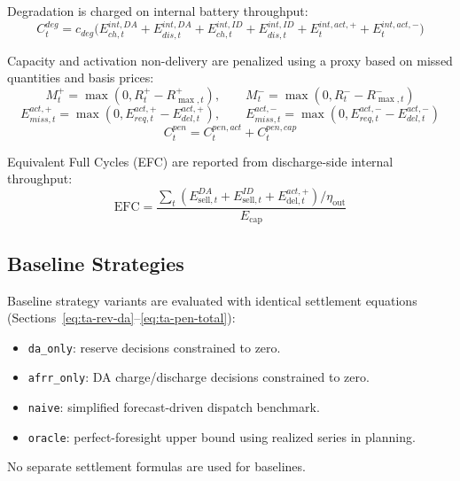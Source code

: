 Degradation is charged on internal battery throughput:
\begin{equation}\label{eq:ta-cost-deg}
    C^{deg}_t
    =
    c_{deg}\Big(
    E^{int,DA}_{ch,t}+E^{int,DA}_{dis,t}
    +E^{int,ID}_{ch,t}+E^{int,ID}_{dis,t}
    +E^{int,act,+}_{t}+E^{int,act,-}_{t}
    \Big)
\end{equation}

Capacity and activation non-delivery are penalized using a proxy based on missed quantities and basis prices:
\begin{equation}\label{eq:ta-missed-cap}
    M^{+}_{t}=\max\!\left(0, R^{+}_{t}-R^{+}_{\max,t}\right),
    \qquad
    M^{-}_{t}=\max\!\left(0, R^{-}_{t}-R^{-}_{\max,t}\right)
\end{equation}
\begin{equation}\label{eq:ta-missed-act}
    E^{act,+}_{miss,t}=\max\!\left(0,E^{act,+}_{req,t}-E^{act,+}_{del,t}\right),
    \qquad
    E^{act,-}_{miss,t}=\max\!\left(0,E^{act,-}_{req,t}-E^{act,-}_{del,t}\right)
\end{equation}
\begin{equation}\label{eq:ta-pen-total}
    C^{pen}_t = C^{pen,act}_t + C^{pen,cap}_t
\end{equation}

Equivalent Full Cycles (EFC) are reported from discharge-side internal throughput:
\begin{equation}\label{eq:ta-efc}
    \mathrm{EFC}
    =
    \frac{
    \sum_t\left(E^{DA}_{\mathrm{sell},t}+E^{ID}_{\mathrm{sell},t}+E^{act,+}_{\mathrm{del},t}\right)/\eta_{\text{out}}
    }{E_{\text{cap}}}
\end{equation}
\subsection{Baseline Strategies}
Baseline strategy variants are evaluated with identical settlement equations (Sections~\ref{eq:ta-rev-da}--\ref{eq:ta-pen-total}):
\begin{itemize}
    \item \texttt{da\_only}: reserve decisions constrained to zero.
    \item \texttt{afrr\_only}: DA charge/discharge decisions constrained to zero.
    \item \texttt{naive}: simplified forecast-driven dispatch benchmark.
    \item \texttt{oracle}: perfect-foresight upper bound using realized series in planning.
\end{itemize}
No separate settlement formulas are used for baselines.
